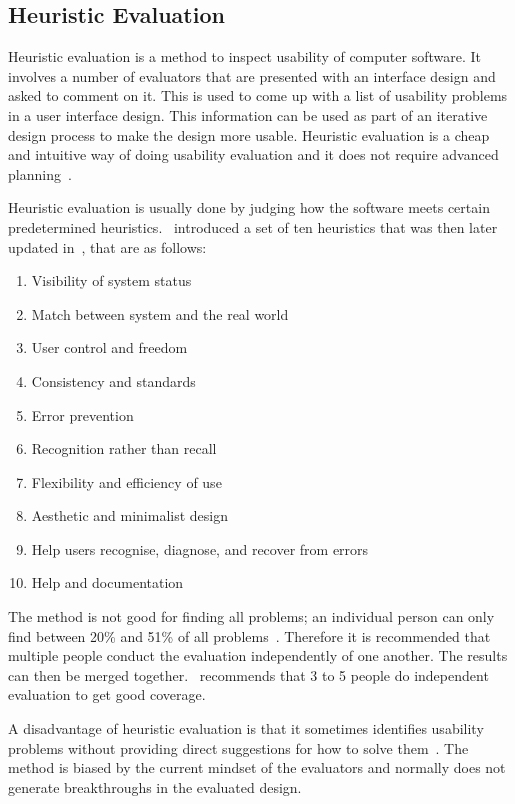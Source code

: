 \subsection{Heuristic Evaluation}
Heuristic evaluation is a method to inspect usability of computer
software. It involves a number of evaluators that are presented with
an interface design and asked to comment on it. This is used to come
up with a list of usability problems in a user interface design. This
information can be used as part of an iterative design process to make the design more usable. Heuristic evaluation is a cheap and intuitive way of doing usability evaluation and it does not require advanced planning~\cite{Nielsen1990}.

Heuristic evaluation is usually done by judging how the software meets certain predetermined heuristics.~\cite{Nielsen1990} introduced a set of ten heuristics that was then later updated in~\cite{Nielsen1994}, that are as follows:

\begin{enumerate}
  \item Visibility of system status
  \item Match between system and the real world
  \item User control and freedom
  \item Consistency and standards
  \item Error prevention
  \item Recognition rather than recall
  \item Flexibility and efficiency of use
  \item Aesthetic and minimalist design
  \item Help users recognise, diagnose, and recover from errors
  \item Help and documentation
\end{enumerate}

The method is not good for finding all problems; an individual person can only find between 20\% and 51\% of all problems~\cite{Nielsen1990}. Therefore it is recommended that multiple people conduct the evaluation independently of one another. The results can then be merged together.~\cite{Nielsen1990} recommends that 3 to 5 people do independent evaluation to get good coverage.

A disadvantage of heuristic evaluation is that it sometimes identifies usability problems without providing direct suggestions for how to solve them~\cite{Nielsen1990}. The method is biased by the current mindset of the evaluators and normally does not generate breakthroughs in the evaluated design.

